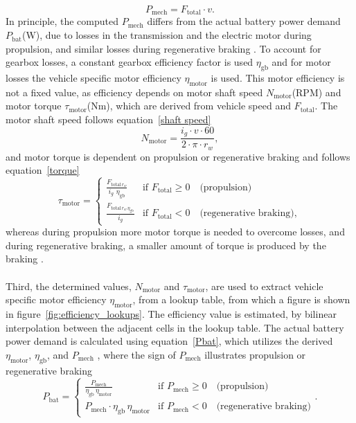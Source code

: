 \begin{equation}
\label{mech}
    P_\text{mech}= F_\text{total}\cdot v.
\end{equation}
In principle, the computed \(P_\text{mech}\) differs from the actual battery power demand \(P_\text{bat}\)(W), due to losses in the transmission and the electric motor during propulsion, and similar losses during regenerative braking \parencite{luin2019microsimulation}. To account for gearbox losses, a constant gearbox efficiency factor is used \(\eta_\text{gb}\) and for motor losses the vehicle specific motor efficiency \(\eta_\text{motor}\) is used. This motor efficiency is not a fixed value, as efficiency depends on motor shaft speed \(N_\text{motor}\)(RPM) and motor torque \(\tau_\text{motor}\)(Nm), which are derived from vehicle speed and \(F_\text{total}\). The motor shaft speed follows equation~\ref{shaft speed}
\begin{equation}
\label{shaft speed}
    N_\text{motor} = \frac{i_g\cdot v \cdot 60}{2 \cdot\pi\cdot r_w},
\end{equation}
and motor torque is dependent on propulsion or regenerative braking and follows equation~\ref{torque}
\\
\begin{equation}
\label{torque}
\tau_{\text{motor}} = \begin{cases} 
\displaystyle\frac{F_{\text{total} \, r_w}}{i_g \ \,\eta_\text{gb}} & \text{if } F_{\text{total}} \geq 0 \quad \text{(propulsion)} \\[2ex] 
\displaystyle\frac{F_{\text{total} \, r_w \, \eta_\text{gb}}}{i_g} & \text{if } F_{\text{total}} < 0 \quad \text{(regenerative braking)},
\end{cases}
\end{equation}
whereas during propulsion more motor torque is needed to overcome losses, and during regenerative braking, a smaller amount of torque is produced by the braking \parencite{luin2019microsimulation}.
\\\\
Third, the determined values, \(N_\text{motor}\) and \(\tau_\text{motor}\), are used to extract vehicle specific motor efficiency \(\eta_\text{motor}\), from a lookup table, from which a figure is shown in figure~\ref{fig:efficiency_lookups}. The efficiency value is estimated, by bilinear interpolation between the adjacent cells in the lookup table.  
The actual battery power demand is calculated using equation~\ref{Pbat}, which utilizes the derived \(\eta_\text{motor}\), \(\eta_\text{gb}\), and \(P_\text{mech}\) \parencite{chen2021review}, where the sign of \(P_\text{mech}\) illustrates propulsion or regenerative braking \begin{equation}
\label{Pbat}
P_{\text{bat}} = \begin{cases}
\displaystyle\frac{P_{\text{mech}}}{\eta_\text{gb}\,\eta_\text{motor}} & \text{if } P_{\text{mech}} \geq 0 \quad \text{(propulsion)} \\[2ex]
P_{\text{mech}} \cdot \eta_\text{gb}\,\eta_\text{motor} & \text{if } P_{\text{mech}} < 0 \quad \text{(regenerative braking)}
\end{cases}.
\end{equation}

